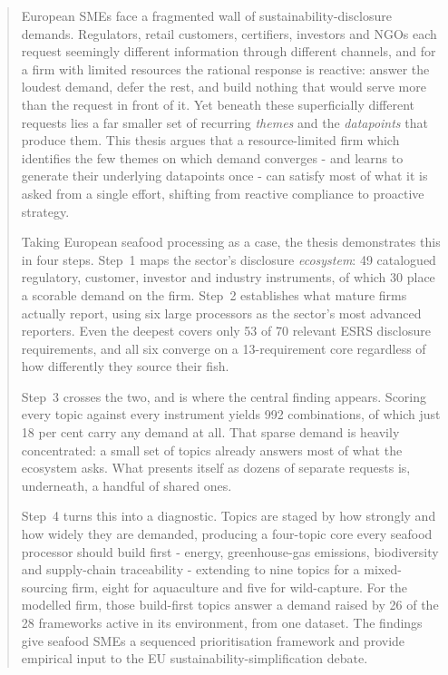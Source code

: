 \documentclass[
]{article}
\begin{document}
\clearpage

\begin{abstract}
\noindent
European SMEs face a fragmented wall of sustainability-disclosure demands.
Regulators, retail customers, certifiers, investors and NGOs each request
seemingly different information through different channels, and for a firm
with limited resources the rational response is reactive: answer the loudest
demand, defer the rest, and build nothing that would serve more than the
request in front of it. Yet beneath these superficially different requests
lies a far smaller set of recurring \emph{themes} and the \emph{datapoints}
that produce them. This thesis argues that a resource-limited firm which
identifies the few themes on which demand converges - and learns to
generate their underlying datapoints once - can satisfy most of what it is
asked from a single effort, shifting from reactive compliance to proactive
strategy.


Taking European seafood processing as a case, the thesis demonstrates this in
four steps. Step~1 maps the sector's disclosure \emph{ecosystem}: 49 catalogued
regulatory, customer, investor and industry instruments, of which 30 place a
scorable demand on the firm. Step~2 establishes what mature firms actually
report, using six large processors as the sector's most advanced reporters. Even
the deepest covers only 53 of 70 relevant ESRS disclosure requirements, and all
six converge on a 13-requirement core regardless of how differently they source
their fish.

Step~3 crosses the two, and is where the central finding appears. Scoring every
topic against every instrument yields 992 combinations, of which just 18 per cent
carry any demand at all. That sparse demand is heavily concentrated: a small set
of topics already answers most of what the ecosystem asks. What presents itself
as dozens of separate requests is, underneath, a handful of shared ones.

Step~4 turns this into a diagnostic. Topics are staged by how strongly and how
widely they are demanded, producing a four-topic core every seafood processor
should build first - energy, greenhouse-gas emissions, biodiversity and
supply-chain traceability - extending to nine topics for a mixed-sourcing firm,
eight for aquaculture and five for wild-capture. For the modelled firm, those
build-first topics answer a demand raised by 26 of the 28 frameworks active in
its environment, from one dataset. The findings give seafood SMEs a sequenced
prioritisation framework and provide empirical input to the EU
sustainability-simplification debate.
\end{abstract}
\end{document}
